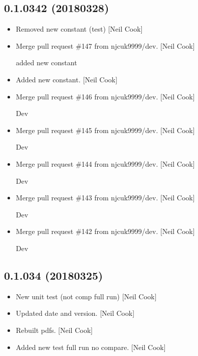 \documentclass[a4paper,10pt,english]{report}
\begin{document}
\subsection{0.1.0342 (2018\sphinxhyphen{}03\sphinxhyphen{}28)}
\label{\detokenize{misc/changelog:id487}}\begin{itemize}
\item {} 
Removed new constant (test) {[}Neil Cook{]}

\item {} 
Merge pull request \#147 from njcuk9999/dev. {[}Neil Cook{]}

added new constant

\item {} 
Added new constant. {[}Neil Cook{]}

\item {} 
Merge pull request \#146 from njcuk9999/dev. {[}Neil Cook{]}

Dev

\item {} 
Merge pull request \#145 from njcuk9999/dev. {[}Neil Cook{]}

Dev

\item {} 
Merge pull request \#144 from njcuk9999/dev. {[}Neil Cook{]}

Dev

\item {} 
Merge pull request \#143 from njcuk9999/dev. {[}Neil Cook{]}

Dev

\item {} 
Merge pull request \#142 from njcuk9999/dev. {[}Neil Cook{]}

Dev

\end{itemize}


\subsection{0.1.034 (2018\sphinxhyphen{}03\sphinxhyphen{}25)}
\label{\detokenize{misc/changelog:id488}}\begin{itemize}
\item {} 
New unit test (not comp full run) {[}Neil Cook{]}

\item {} 
Updated date and version. {[}Neil Cook{]}

\item {} 
Rebuilt pdfs. {[}Neil Cook{]}

\item {} 
Added new test full run no compare. {[}Neil Cook{]}

\end{itemize}
\end{document}
